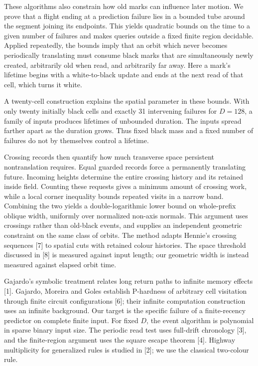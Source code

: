 \documentclass[
  11pt,
]{article}
\begin{document}
These algorithms also constrain how old marks can influence later motion.
We prove that a flight ending at a prediction failure lies in a bounded tube
around the segment joining its endpoints. This yields quadratic bounds on
the time to a given number of failures and makes queries outside a fixed
finite region decidable. Applied repeatedly, the bounds imply that an orbit
which never becomes periodically translating must consume black marks that
are simultaneously newly created, arbitrarily old when read, and arbitrarily
far away. Here a mark's lifetime begins with a white-to-black update and ends
at the next read of that cell, which turns it white.

A twenty-cell construction explains the spatial parameter in these bounds. With
only twenty initially black cells and exactly 31 intervening failures for
$D=128$, a family of inputs produces lifetimes of unbounded duration. The
inputs spread farther apart as the duration grows. Thus fixed black mass and
a fixed number of failures do not by themselves control a lifetime.

Crossing records then quantify how much transverse space persistent
nontranslation requires. Equal guarded records force a permanently translating
future. Incoming heights determine the entire crossing history and its retained
inside field. Counting these requests gives a minimum amount of crossing work, while a local corner inequality bounds repeated visits in a narrow
band. Combining the two yields a double-logarithmic lower bound on whole-prefix
oblique width, uniformly over normalized non-axis normals. This argument uses
crossings rather than old-black events, and supplies an independent geometric
constraint on the same class of orbits. The method adapts Hennie's
crossing sequences [7] to spatial cuts with retained colour histories.
The space threshold discussed in [8] is measured against input length;
our geometric width is instead measured against elapsed orbit time.

Gajardo's symbolic treatment relates long return paths to infinite memory
effects {[}1{]}. Gajardo, Moreira and Goles establish P-hardness of arbitrary
cell visitation through finite circuit configurations {[}6{]}; their infinite
computation construction uses an infinite background. Our target is the
specific failure of a finite-recency predictor on complete finite input.
For fixed $D$, the event algorithm is polynomial in sparse binary input size.
The periodic read test uses full-drift chronology {[}3{]}, and the finite-region
argument uses the square escape theorem {[}4{]}. Highway multiplicity for
generalized rules is studied in {[}2{]}; we use the classical two-colour rule.
\end{document}
